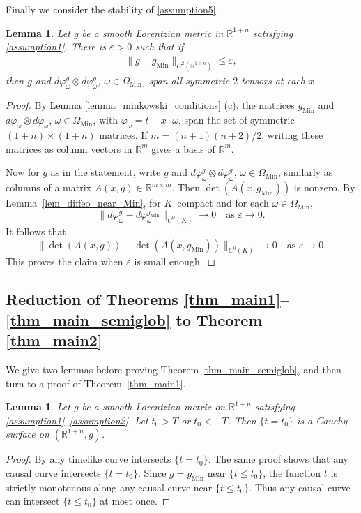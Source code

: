 \documentclass[11pt,letterpaper]{amsart}
\newtheorem{Lemma}[Theorem]{Lemma}
\theoremstyle{definition}
\numberwithin{equation}{section}
\newcommand{\mR}{\mathbb{R}}                    %
\newcommand{\norm}[1]{\lVert #1 \rVert}         %
\newcommand{\eps}{\varepsilon}
\newcommand{\gm}{g_{\mathrm{Min}}}
\def\R{\mathbb R}
\begin{document}
Finally we consider the stability of \eqref{assumption5}.

\begin{Lemma}\label{lem_spanning_near_Min}
Let $g$ be a smooth Lorentzian metric in $\mR^{1+n}$ satisfying \eqref{assumption1}. There is $\eps > 0$ such that if
\begin{gather*}
\norm{g-\gm}_{C^2(\R^{1+n})} \le \eps,
\end{gather*}
then $g$ and
$d\varphi_\omega^g \otimes d\varphi_\omega^g$, $\omega \in \Omega_{\mathrm{Min}}$, span all symmetric $2$-tensors at each $x$.
\end{Lemma}
\begin{proof}
By Lemma \ref{lemma_minkowski_conditions} (c), the matrices $\gm$ and $d\varphi_{\omega} \otimes d\varphi_{\omega}$, $\omega \in \Omega_{\mathrm{Min}}$, with $\varphi_{\omega} = t - x \cdot \omega$, span the set of symmetric $(1+n) \times (1+n)$ matrices. If $m = (n+1)(n+2)/2$, writing these matrices as column vectors in $\mR^{m}$ gives a basis of $\mR^m$.

Now for $g$ as in the statement, write $g$ and $d\varphi_\omega^g \otimes d\varphi_\omega^g$, $\omega \in \Omega_{\mathrm{Min}}$, similarly as columns of a matrix $A(x, g) \in \R^{m \times m}$. 
Then $\det(A(x,\gm))$ is nonzero. By Lemma~\ref{lem_diffeo_near_Min}, for $K$ compact and for each $\omega \in \Omega_{\mathrm{Min}}$,
\[
\norm{d\varphi_\omega^g - d\varphi_\omega^{\gm}}_{C^0(K)} \to 0 \quad \text{as } \eps \to 0.
\]
It follows that
\[
\norm{\det(A(x,g)) - \det(A(x,\gm))}_{C^0(K)} \to 0 \quad \text{as } \eps \to 0.
\]
This proves the claim when $\eps$ is small enough.
\end{proof}



\subsection{Reduction of Theorems \ref{thm_main1}--\ref{thm_main_semiglob} to Theorem \ref{thm_main2}}

We give two lemmas before proving Theorem \ref{thm_main_semiglob}, and then turn to a proof of Theorem~\ref{thm_main1}.

\begin{Lemma}
Let $g$ be a smooth Lorentzian metric on $\R^{1+n}$ satisfying \eqref{assumption1}--\eqref{assumption2}. %
Let $t_0 > T$ or $t_0 < -T$. Then $\{t=t_0\}$ is a Cauchy surface on $(\R^{1+n}, g)$.
\end{Lemma}
\begin{proof}
By \cite[Lemma 2.8]{oksanen2024} any timelike curve intersects $\{t=t_0\}$. The same proof shows that any causal curve intersects $\{t=t_0\}$. Since $g = \gm$ near $\{t \le t_0\}$, the function $t$ is strictly monotonous along any causal curve near $\{t \le t_0\}$. Thus any causal curve can intersect $\{t \le t_0\}$ at most once.
\end{proof}
\end{document}

